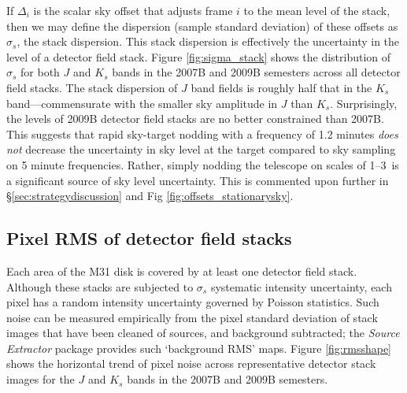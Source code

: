 \documentclass[iop]{emulateapj}
\newcommand{\sw}[1]{\textit{#1}} %
\begin{document}


If $\Delta_i$ is the scalar sky offset that adjusts frame $i$ to the mean level of the stack, then we may define the dispersion (sample standard deviation) of these offsets as $\sigma_s$, the stack dispersion.
% 
% 
This stack dispersion is effectively the uncertainty in the level of a detector field stack. Figure \ref{fig:sigma_stack} shows the distribution of $\sigma_s$ for both $J$ and $K_s$ bands in the 2007B and 2009B semesters across all detector field stacks. The stack dispersion of $J$ band fields is roughly half that in the $K_s$ band---commensurate with the smaller sky amplitude in $J$ than $K_s$. Surprisingly, the levels of 2009B detector field stacks are no better constrained than 2007B. This suggests that rapid sky-target nodding with a frequency of 1.2 minutes \emph{does not} decrease the uncertainty in sky level at the target compared to sky sampling on 5 minute frequencies. Rather, simply nodding the telescope on scales of 1\arcdeg--3\arcdeg\ is a significant source of sky level uncertainty. This is commented upon further in \S \ref{sec:strategydiscussion} and Fig \ref{fig:offsets_stationarysky}.

\subsection{Pixel RMS of detector field stacks}

Each area of the M31 disk is covered by at least one detector field stack. Although these stacks are subjected to $\sigma_s$ systematic intensity uncertainty, each pixel has a random intensity uncertainty governed by Poisson statistics. Such noise can be measured empirically from the pixel standard deviation of stack images that have been cleaned of sources, and background subtracted; the \sw{Source Extractor} package \citep{Bertin:1996} provides such `background RMS' maps. Figure \ref{fig:rmsshape} shows the horizontal trend of pixel noise across representative detector stack images for the $J$ and $K_s$ bands in the 2007B and 2009B semesters.
\end{document}
